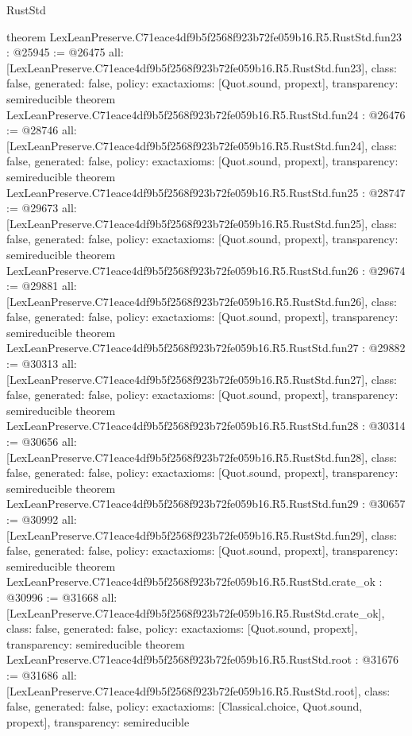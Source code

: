 \begin{lexlean}{RustStd}
\begin{coremodule}
{}
theorem LexLeanPreserve.C71eace4df9b5f2568f923b72fe059b16.R5.RustStd.fun23 : @25945 := @26475 {
  all: [LexLeanPreserve.C71eace4df9b5f2568f923b72fe059b16.R5.RustStd.fun23],
  class: false,
  generated: false,
  policy: exact{axioms: [Quot.sound, propext]},
  transparency: semireducible
}
theorem LexLeanPreserve.C71eace4df9b5f2568f923b72fe059b16.R5.RustStd.fun24 : @26476 := @28746 {
  all: [LexLeanPreserve.C71eace4df9b5f2568f923b72fe059b16.R5.RustStd.fun24],
  class: false,
  generated: false,
  policy: exact{axioms: [Quot.sound, propext]},
  transparency: semireducible
}
theorem LexLeanPreserve.C71eace4df9b5f2568f923b72fe059b16.R5.RustStd.fun25 : @28747 := @29673 {
  all: [LexLeanPreserve.C71eace4df9b5f2568f923b72fe059b16.R5.RustStd.fun25],
  class: false,
  generated: false,
  policy: exact{axioms: [Quot.sound, propext]},
  transparency: semireducible
}
theorem LexLeanPreserve.C71eace4df9b5f2568f923b72fe059b16.R5.RustStd.fun26 : @29674 := @29881 {
  all: [LexLeanPreserve.C71eace4df9b5f2568f923b72fe059b16.R5.RustStd.fun26],
  class: false,
  generated: false,
  policy: exact{axioms: [Quot.sound, propext]},
  transparency: semireducible
}
theorem LexLeanPreserve.C71eace4df9b5f2568f923b72fe059b16.R5.RustStd.fun27 : @29882 := @30313 {
  all: [LexLeanPreserve.C71eace4df9b5f2568f923b72fe059b16.R5.RustStd.fun27],
  class: false,
  generated: false,
  policy: exact{axioms: [Quot.sound, propext]},
  transparency: semireducible
}
theorem LexLeanPreserve.C71eace4df9b5f2568f923b72fe059b16.R5.RustStd.fun28 : @30314 := @30656 {
  all: [LexLeanPreserve.C71eace4df9b5f2568f923b72fe059b16.R5.RustStd.fun28],
  class: false,
  generated: false,
  policy: exact{axioms: [Quot.sound, propext]},
  transparency: semireducible
}
theorem LexLeanPreserve.C71eace4df9b5f2568f923b72fe059b16.R5.RustStd.fun29 : @30657 := @30992 {
  all: [LexLeanPreserve.C71eace4df9b5f2568f923b72fe059b16.R5.RustStd.fun29],
  class: false,
  generated: false,
  policy: exact{axioms: [Quot.sound, propext]},
  transparency: semireducible
}
theorem LexLeanPreserve.C71eace4df9b5f2568f923b72fe059b16.R5.RustStd.crate_ok : @30996 := @31668 {
  all: [LexLeanPreserve.C71eace4df9b5f2568f923b72fe059b16.R5.RustStd.crate_ok],
  class: false,
  generated: false,
  policy: exact{axioms: [Quot.sound, propext]},
  transparency: semireducible
}
theorem LexLeanPreserve.C71eace4df9b5f2568f923b72fe059b16.R5.RustStd.root : @31676 := @31686 {
  all: [LexLeanPreserve.C71eace4df9b5f2568f923b72fe059b16.R5.RustStd.root],
  class: false,
  generated: false,
  policy: exact{axioms: [Classical.choice, Quot.sound, propext]},
  transparency: semireducible
}


\end{coremodule}
\end{lexlean}

